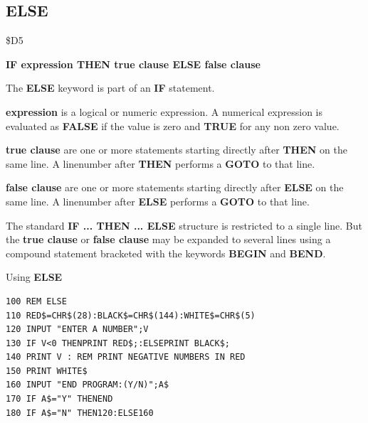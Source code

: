 \subsection{ELSE}
\begin{description}[leftmargin=2cm,style=nextline]
\item [Token:] \$D5
\item [Format:] {\bf IF expression THEN true clause ELSE false clause}
\item [Usage:] The {\bf ELSE} keyword is part of an {\bf IF}
               statement.

               {\bf expression} is a logical or numeric expression.
               A numerical expression is evaluated as {\bf FALSE}
               if the value is zero and {\bf TRUE} for any non zero
               value.

               {\bf true clause} are one or more statements starting
               directly after {\bf THEN} on the same line.
               A linenumber after {\bf THEN} performs a
               {\bf GOTO} to that line.

               {\bf false clause} are one or more statements starting
               directly after {\bf ELSE} on the same line.
               A linenumber after {\bf ELSE} performs a
               {\bf GOTO} to that line.

\item [Remarks:]
               The standard {\bf IF ... THEN ... ELSE} structure
               is restricted to a single line. But the {\bf true clause}
               or {\bf false clause} may be expanded to several lines
               using a compound statement bracketed with the keywords
               {\bf BEGIN} and {\bf BEND}.
\item [Example:]
                Using {\bf ELSE}
\begin{tcolorbox}[colback=black,coltext=white]
\verbatimfont{\codefont}
\begin{verbatim}
100 REM ELSE
110 RED$=CHR$(28):BLACK$=CHR$(144):WHITE$=CHR$(5)
120 INPUT "ENTER A NUMBER";V
130 IF V<0 THENPRINT RED$;:ELSEPRINT BLACK$;
140 PRINT V : REM PRINT NEGATIVE NUMBERS IN RED
150 PRINT WHITE$
160 INPUT "END PROGRAM:(Y/N)";A$
170 IF A$="Y" THENEND
180 IF A$="N" THEN120:ELSE160
\end{verbatim}
\end{tcolorbox}
\end{description}



